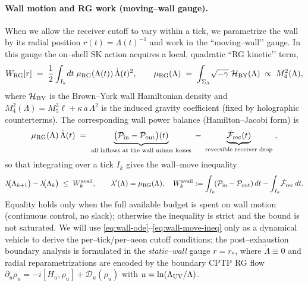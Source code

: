 \documentclass[10pt]{article}
\theoremstyle{definition}
\theoremstyle{plain}
\begin{document}
\paragraph{Wall motion and RG work (moving–wall gauge).}\label{par:uom-main-078}
When we allow the receiver cutoff to vary within a tick, we parametrize the wall by its radial position
$r(t)=\Lambda(t)^{-1}$ and work in the ``moving–wall’’ gauge. In this gauge the on–shell SK action acquires
a local, quadratic ``RG kinetic’’ term,
\begin{equation}
W_{\rm RG}[r]
\;=\;
\frac12\int_{I_k}\! dt\;\mu_{\rm RG}(\Lambda(t))\,\dot\Lambda(t)^{2},
\qquad
\mu_{\rm RG}(\Lambda)
\;=\;\int_{\Sigma_{\Lambda}}\!\sqrt{-\gamma}\;\mathcal H_{\rm BY}(\Lambda)
\;\propto\; M_4^2(\Lambda),
\label{eq:RG-kinetic}
\end{equation}
where $\mathcal H_{\rm BY}$ is the Brown--York wall Hamiltonian density and $M_4^2(\Lambda)=M_5^3\ell+\kappa\,a\,\Lambda^2$
is the induced gravity coefficient (fixed by holographic counterterms).
The corresponding wall power balance (Hamilton--Jacobi form) is
\begin{equation}
\mu_{\rm RG}(\Lambda)\,\dot\Lambda(t)
\;=\;
\underbrace{\big(\mathcal P_{\rm in}-\mathcal P_{\rm out}\big)(t)}_{\text{all inflows at the wall minus losses}}
\;-\;
\underbrace{\dot{\mathcal F}_{\rm rec}(t)}_{\text{reversible receiver drop}}\;,
\label{eq:wall-ode}
\end{equation}
so that integrating over a tick $I_k$ gives the wall--move inequality
\begin{equation}
\lambda\!\big(\Lambda_{k+1}\big)-\lambda\!\big(\Lambda_{k}\big)
\;\le\;
W^{\rm avail}_k,
\qquad
\lambda'(\Lambda)=\mu_{\rm RG}(\Lambda),\quad
W^{\rm avail}_k:=\int_{I_k}\!(\mathcal P_{\rm in}-\mathcal P_{\rm out})\,dt-\int_{I_k}\!\dot{\mathcal F}_{\rm rec}\,dt.
\label{eq:wall-move-ineq}
\end{equation}
Equality holds only when the full available budget is spent on wall motion (continuous control, no slack);
otherwise the inequality is strict and the bound is not saturated.
We will use \eqref{eq:wall-ode}--\eqref{eq:wall-move-ineq} only as a dynamical vehicle to derive the per–tick/per–aeon
cutoff conditions; the post--exhaustion boundary analysis is formulated in the \emph{static--wall} gauge $r=r_\ast$,
where $\dot\Lambda\equiv 0$ and radial reparametrizations are encoded by the boundary CPTP RG flow
$\partial_u\rho_u=-i[H_u,\rho_u]+\mathcal D_u(\rho_u)$ with $u=\ln(\Lambda_{\rm UV}/\Lambda)$.
\end{document}
